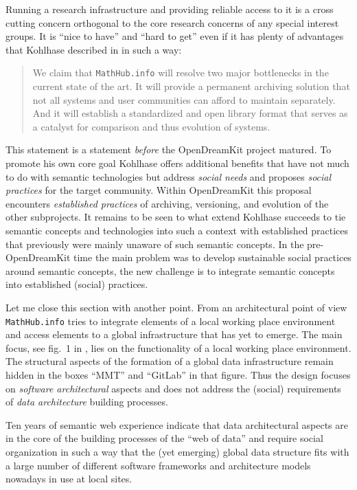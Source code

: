 \documentclass{llncs}
\begin{document}
Running a research infrastructure and providing reliable access to it is a
cross cutting concern \cite{ccc} orthogonal to the core research concerns of
any special interest groups. It is ``nice to have'' and ``hard to get'' even
if it has plenty of advantages that Kohlhase described in \cite{mathhub} in
such a way:
\begin{quote}
  We claim that \texttt{MathHub.info} will resolve two major bottlenecks in the
  current state of the art. It will provide a permanent archiving solution that
  not all systems and user communities can afford to maintain separately. And
  it will establish a standardized and open library format that serves as a
  catalyst for comparison and thus evolution of systems.
\end{quote}
This statement is a statement \emph{before} the OpenDreamKit project matured.
To promote his own core goal Kohlhase offers additional benefits that have not
much to do with semantic technologies but address \emph{social needs} and
proposes \emph{social practices} for the target community.  Within OpenDreamKit
this proposal encounters \emph{established practices} of archiving, versioning,
and evolution of the other subprojects. It remains to be seen to what extend
Kohlhase succeeds to tie semantic concepts and technologies into such a context
with established practices that previously were mainly unaware of such semantic
concepts.  In the pre-OpenDreamKit time the main problem was to develop
sustainable social practices around semantic concepts, the new challenge is to
integrate semantic concepts into established (social) practices. 
\medskip

Let me close this section with another point. From an architectural point of
view \texttt{MathHub.info} tries to integrate elements of a local working place
environment and access elements to a global infrastructure that has yet to
emerge. The main focus, see fig.~1 in \cite{mathhub}, lies on the functionality
of a local working place environment.  The structural aspects of the formation
of a global data infra\-structure remain hidden in the boxes ``MMT'' and
``GitLab'' in that figure. Thus the design focuses on \emph{software
  architectural} aspects and does not address the (social) requirements of
\emph{data architecture} building processes.

Ten years of semantic web experience indicate that data architectural aspects
are in the core of the building processes of the ``web of data'' and require
social organization in such a way that the (yet emerging) global data
structure fits with a large number of different software frameworks and
architecture models nowadays in use at local sites.
\end{document}

